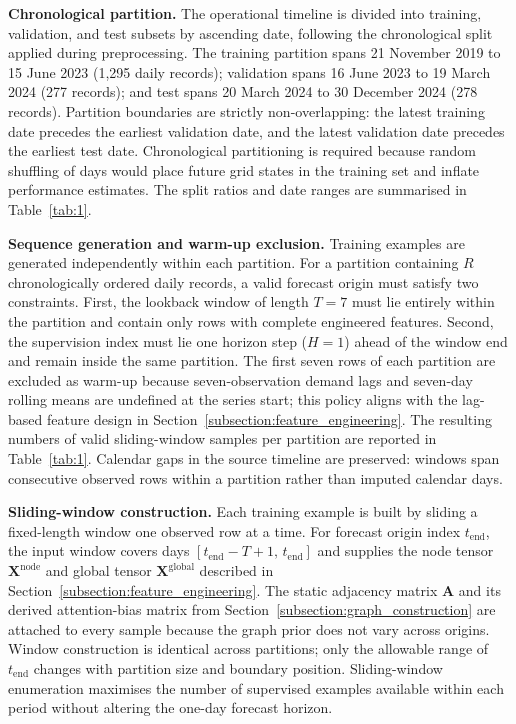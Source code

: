 \textbf{Chronological partition.} The operational timeline is divided into training, validation, and test subsets by ascending date, following the chronological split applied during preprocessing. The training partition spans 21 November 2019 to 15 June 2023 (1,295 daily records); validation spans 16 June 2023 to 19 March 2024 (277 records); and test spans 20 March 2024 to 30 December 2024 (278 records). Partition boundaries are strictly non-overlapping: the latest training date precedes the earliest validation date, and the latest validation date precedes the earliest test date. Chronological partitioning is required because random shuffling of days would place future grid states in the training set and inflate performance estimates. The split ratios and date ranges are summarised in Table~\ref{tab:1}.

\textbf{Sequence generation and warm-up exclusion.} Training examples are generated independently within each partition. For a partition containing \(R\) chronologically ordered daily records, a valid forecast origin must satisfy two constraints. First, the lookback window of length \(T = 7\) must lie entirely within the partition and contain only rows with complete engineered features. Second, the supervision index must lie one horizon step (\(H = 1\)) ahead of the window end and remain inside the same partition. The first seven rows of each partition are excluded as warm-up because seven-observation demand lags and seven-day rolling means are undefined at the series start; this policy aligns with the lag-based feature design in Section~\ref{subsection:feature_engineering}. The resulting numbers of valid sliding-window samples per partition are reported in Table~\ref{tab:1}. Calendar gaps in the source timeline are preserved: windows span consecutive observed rows within a partition rather than imputed calendar days.

\textbf{Sliding-window construction.} Each training example is built by sliding a fixed-length window one observed row at a time. For forecast origin index \(t_{\mathrm{end}}\), the input window covers days \([t_{\mathrm{end}} - T + 1, \, t_{\mathrm{end}}]\) and supplies the node tensor \(\mathbf{X}^{\mathrm{node}}\) and global tensor \(\mathbf{X}^{\mathrm{global}}\) described in Section~\ref{subsection:feature_engineering}. The static adjacency matrix \(\mathbf{A}\) and its derived attention-bias matrix from Section~\ref{subsection:graph_construction} are attached to every sample because the graph prior does not vary across origins. Window construction is identical across partitions; only the allowable range of \(t_{\mathrm{end}}\) changes with partition size and boundary position. Sliding-window enumeration maximises the number of supervised examples available within each period without altering the one-day forecast horizon.

